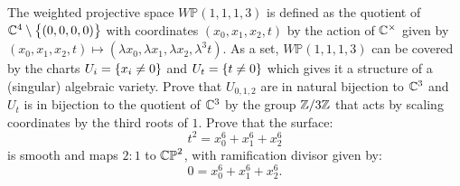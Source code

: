 \documentclass[11pt, a4paper]{article}
\renewcommand{\P}{\mathbb{P}}
\begin{document}
\begin{exercise}
  The weighted projective space $W\P(1,1,1,3)$ is defined as the quotient
  of $\mathbb{C}^4 \setminus \left\{(0,0,0,0)\right\}$ with coordinates $(x_0,x_1,x_2,t)$
  by the action of $\mathbb{C}^{\times}$ given by $(x_0,x_1,x_2,t) \mapsto
  (\lambda x_0, \lambda x_1, \lambda x_2, \lambda^3 t)$.
  As a set, $W\P(1,1,1,3)$ can be covered by the charts $U_i = \left\{x_i \neq 0\right\}$
  and $U_t = \left\{t \neq 0\right\}$ which gives it a structure of a (singular)
  algebraic variety.
  Prove that $U_{0,1,2}$ are in natural bijection to $\mathbb{C}^3$ and $U_t$
  is in bijection to the quotient of $\mathbb{C}^3$ by the group $\mathbb{Z}/3\mathbb{Z}$
  that acts by scaling coordinates by the third roots of $1$.
  Prove that the surface:
  \[
    t^2 = x_0^6 + x_1^6 + x_2^6
  \]
  is smooth and maps $2 : 1$ to $\mathbb{CP}^2$, with ramification divisor given by:
  \[
    0 = x_0^6 + x_1^6 + x_2^6.
  \]
\end{exercise}
\end{document}

